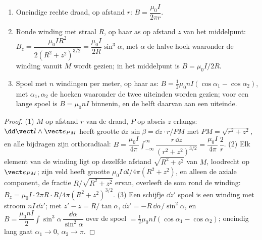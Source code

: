 \begin{proposition}\label{prop:b1:magnetostatics:three}
\begin{enumerate}
  \item Oneindige rechte draad, op afstand $r$: $B = \dfrac{\mu_0I}{2\pi r}$.
  \item Ronde winding met straal $R$, op haar as op afstand $z$ van
        het middelpunt: $B_z = \dfrac{\mu_0IR^2}{2(R^2 + z^2)^{3/2}} = \dfrac{\mu_0I}{2R}
        \sin^3\alpha$, met $\alpha$ de halve hoek waaronder de winding
        vanuit $M$ wordt gezien; in het middelpunt is $B = \mu_0I/2R$.
  \item Spoel met $n$ windingen per meter, op haar as: $B = \tfrac12\mu_0nI
        (\cos\alpha_1 - \cos\alpha_2)$, met $\alpha_1, \alpha_2$ de hoeken waaronder
        de twee uiteinden worden gezien; voor een lange spoel is $B = \mu_0nI$
        binnenin, en de helft daarvan aan een uiteinde.
\end{enumerate}
\end{proposition}

\begin{proof}
(1) $M$ op afstand $r$ van de draad, $P$ op abscis $z$ erlangs:
$\dd\vect l\wedge\vect e_{PM}$ heeft grootte $\dd z\,\sin\beta = \dd z\cdot r/PM$
met $PM = \sqrt{r^2 + z^2}$, en alle bijdragen zijn orthoradiaal:
$B = \dfrac{\mu_0I}{4\pi}\displaystyle\int_{-\infty}^{\infty}\dfrac{r\,\dd z}{(r^2 + z^2)^{3/2}}
= \dfrac{\mu_0I}{4\pi}\,\dfrac{2}{r}$. (2) Elk element van de winding ligt op
dezelfde afstand $\sqrt{R^2 + z^2}$ van $M$, loodrecht op
$\vect e_{PM}$; zijn veld heeft grootte $\mu_0I\,\dd l/4\pi(R^2 + z^2)$, en
alleen de axiale component, de fractie $R/\sqrt{R^2 + z^2}$ ervan,
overleeft de som rond de winding: $B_z = \mu_0I\cdot2\pi R\cdot R/4\pi(R^2 +
z^2)^{3/2}$. (3) Een schijfje $\dd z'$ spoel is een winding met stroom
$nI\,\dd z'$; met $z' - z = R/\tan\alpha$, $\dd z' = -R\,\dd\alpha/\sin^2\alpha$,
en $B = \dfrac{\mu_0nI}{2}\displaystyle\int\sin^3\alpha\,\dfrac{\dd\alpha}{\sin^2\alpha}$ over
de spoel $= \tfrac12\mu_0nI(\cos\alpha_1 - \cos\alpha_2)$; oneindig
lang gaat $\alpha_1 \to 0$, $\alpha_2 \to \pi$.
\end{proof}

